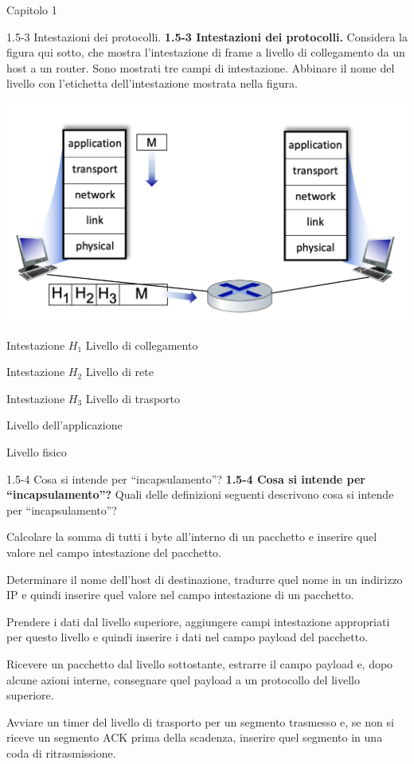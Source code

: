 \documentclass[a4paper]{article}
\begin{document}
\begin{quiz}{Capitolo 1}
\begin{matching}[points=1,shuffle=true]{1.5-3 Intestazioni dei protocolli.}
\textbf{1.5-3 Intestazioni dei protocolli.}
Considera la figura qui sotto, che mostra l'intestazione di frame a livello di collegamento da un host a un router. Sono mostrati tre campi di intestazione. Abbinare il nome del livello con l'etichetta dell'intestazione mostrata nella figura.

\begin{center}
\includegraphics[width=.9\linewidth]{figs/1.5.3.jpg}
\end{center}

\item Intestazione $H_1$ \answer Livello di collegamento
\item Intestazione $H_2$ \answer Livello di rete
\item Intestazione $H_3$ \answer Livello di trasporto
\item \answer Livello dell'applicazione
\item \answer Livello fisico
\end{matching}

\begin{multi}[points=1,shuffle=true]{1.5-4 Cosa si intende per ``incapsulamento''?}
\textbf{1.5-4 Cosa si intende per ``incapsulamento''?}
Quali delle definizioni seguenti descrivono cosa si intende per ``incapsulamento''?
\item Calcolare la somma di tutti i byte all'interno di un pacchetto e inserire quel valore nel campo intestazione del pacchetto.
\item Determinare il nome dell'host di destinazione, tradurre quel nome in un indirizzo IP e quindi inserire quel valore nel campo intestazione di un pacchetto.
\item* Prendere i dati dal livello superiore, aggiungere campi intestazione appropriati per questo livello e quindi inserire i dati nel campo payload del pacchetto.
\item Ricevere un pacchetto dal livello sottostante, estrarre il campo payload e, dopo alcune azioni interne, consegnare quel payload a un protocollo del livello superiore.
\item Avviare un timer del livello di trasporto per un segmento trasmesso e, se non si riceve un segmento ACK prima della scadenza, inserire quel segmento in una coda di ritrasmissione.
\end{multi}



\end{quiz}
\end{document}
